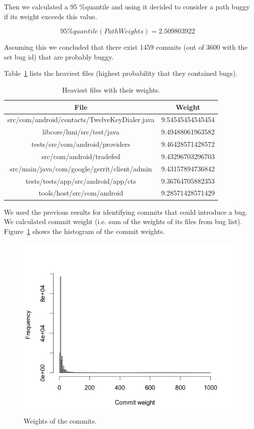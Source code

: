 \documentclass[a4paper,11pt]{article}
\begin{document}
Then we calculated a 95 \%quantile and using it decided to consider a path buggy if its weight exceeds this value. 

\[95\%quantile(PathWeights) = 2.509803922\]

Assuming this we concluded that there exist 1459 commits (out of 3600 with the set bug id) that are probably buggy.

Table~\ref{tbl:weights} lists the heaviest files (highest probability that they contained bugs).

\begin{table}[ht!]
\centering
\begin{tabular}{|c|c|}
\hline
File & Weight\tabularnewline
\hline
\hline
src/com/android/contacts/TwelveKeyDialer.java & 9.54545454545454\tabularnewline
\hline
libcore/luni/src/test/java & 9.49488061963582\tabularnewline
\hline
tests/src/com/android/providers & 9.46428571428572\tabularnewline
\hline
src/com/android/tradefed & 9.43296703296703\tabularnewline
\hline
src/main/java/com/google/gerrit/client/admin & 9.43157894736842\tabularnewline
\hline
tests/tests/app/src/android/app/cts & 9.36764705882353\tabularnewline
\hline
tools/host/src/com/android & 9.28571428571429\tabularnewline
\hline
\end{tabular}
\caption{Heaviest files with their weights.}
\label{tbl:weights}
\end{table}

We used the previous results for identifying commits that could introduce a
bug. We calculated commit weight (i.e. sum  of the weights of its files from bug
list). Figure~\ref{fig:commit_weights} shows the histogram of the commit weights.

\begin{figure}[ht!]
\centering
\includegraphics[width=1.2\textwidth]{../diagrams/commit_weight.png}
\caption{Weights of the commits.}
\label{fig:commit_weights}
\end{figure}
\end{document}
